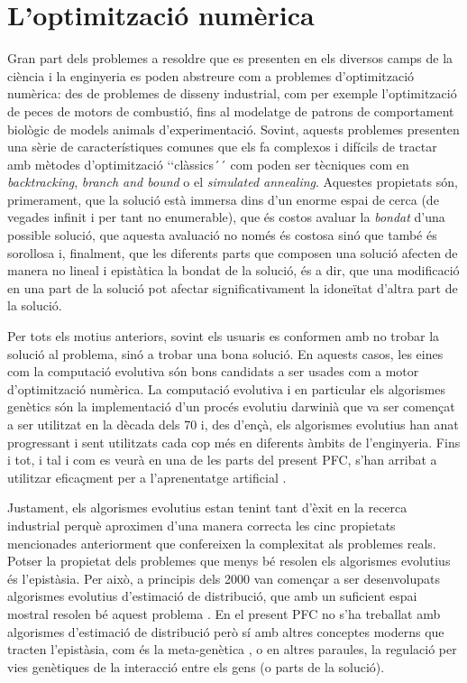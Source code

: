 \section{L’optimització numèrica} Gran part dels problemes a resoldre que es
presenten en els diversos camps de la ciència i la enginyeria es poden abstreure
com a problemes d’optimització numèrica: des de problemes de disseny industrial,
com per exemple l’optimització de peces de motors de combustió, fins al
modelatge de patrons de comportament biològic de models animals
d’experimentació. Sovint, aquests problemes presenten una sèrie de
característiques comunes que els fa complexos i difícils de tractar amb mètodes
d’optimització ‘‘clàssics´´ com poden ser tècniques com en \emph{backtracking},
\emph{branch and bound} o el \emph{simulated annealing}. Aquestes propietats
són, primerament, que la solució està immersa dins d’un enorme espai de cerca
(de vegades infinit i per tant no enumerable), que és costos avaluar la
\emph{bondat} d’una possible solució, que aquesta avaluació no només és costosa
sinó que també és sorollosa i, finalment, que les diferents parts que composen
una solució afecten de manera no lineal i epistàtica la bondat de la solució, és
a dir, que una modificació en una part de la solució pot afectar
significativament  la idoneïtat d’altra part de la solució.

Per tots els motius anteriors, sovint els usuaris es conformen amb no trobar la
solució al problema, sinó a trobar una bona solució. En aquests casos,  les
eines com la computació evolutiva són bons candidats a ser usades com a motor
d’optimització numèrica. La computació evolutiva i en particular els algorismes
genètics són la implementació d’un procés evolutiu darwinià que va ser començat
a ser utilitzat en la dècada dels 70 \cite{H75} i, des d’ençà, els algorismes
evolutius han anat progressant i sent utilitzats cada cop més en diferents
àmbits de l’enginyeria. Fins i tot, i tal i com es veurà en una de les parts del
present PFC, s’han arribat a utilitzar eficaçment per a l’aprenentatge
artificial \cite{G89}.

Justament, els algorismes evolutius estan tenint tant d’èxit en la recerca
industrial perquè aproximen d’una manera correcta les cinc propietats
mencionades anteriorment que confereixen la complexitat als problemes reals.
Potser la propietat dels problemes que menys bé resolen els algorismes evolutius
és l’epistàsia. Per això, a principis dels 2000 van començar a ser desenvolupats
algorismes evolutius d’estimació de distribució, que amb un suficient espai
mostral resolen bé aquest problema \cite{LL02}. En el present PFC no s’ha
treballat amb algorismes d’estimació de distribució però sí amb altres conceptes
moderns que tracten l’epistàsia, com és la meta-genètica \cite{ferreira:2006}, o
en altres paraules, la regulació per vies genètiques de la interacció entre els
gens (o parts de la solució).

